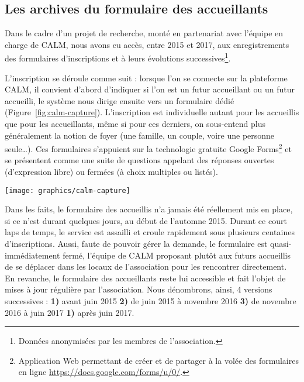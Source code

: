 \documentclass[symmetric,justified,marginals=raggedouter]{tufte-book}
\begin{document}
\subsection{Les archives du formulaire des accueillants}

\noindent Dans le cadre d'un projet de recherche, monté en partenariat avec l'équipe en charge de CALM, nous avons eu accès, entre 2015 et 2017, aux enregistrements des formulaires d'inscriptions et à leurs évolutions successives\footnote{\RaggedOuter Données anonymisées par les membres de l'association.}. 

L'inscription se déroule comme suit : lorsque l'on se connecte sur la plateforme CALM, il convient d'abord d'indiquer si l'on est un futur accueillant ou un futur accueilli, le système nous dirige ensuite vers un formulaire dédié (Figure~\ref{fig:calm-capture}). L'inscription est individuelle autant pour les accueillis que pour les accueillants, même si pour ces derniers, on sous-entend plus généralement la notion de foyer (une famille, un  couple, voire une personne seule\ldots{}). Ces formulaires s'appuient sur la technologie gratuite Google Forms\footnote{\RaggedOuter Application Web permettant de créer et de partager à la volée des formulaires en ligne \url{https://docs.google.com/forms/u/0/}.} et se présentent comme une suite de questions appelant des réponses ouvertes (d'expression libre) ou fermées (à choix multiples ou listés).

\begin{figure*}
  \texttt{[image: graphics/calm-capture]}
  \caption{Premières questions du formulaire accueillants}
  \label{fig:calm-capture}
\end{figure*}

\noindent Dans les faits, le formulaire des accueillis n'a jamais été réellement mis en place, si ce n'est durant quelques jours, au début de l'automne 2015. Durant ce court laps de temps, le service est assailli et croule rapidement sous plusieurs centaines d'inscriptions. Aussi, faute de pouvoir gérer la demande, le formulaire est quasi-immédiatement fermé, l'équipe de CALM proposant plutôt aux futurs accueillis de se déplacer dans les locaux de l'association pour les rencontrer directement. En revanche, le formulaire des accueillants reste lui accessible et fait l'objet de mises à jour régulière par l'association. Nous dénombrons, ainsi, 4 versions successives : \textbf{1)} avant juin 2015 \textbf{2)} de juin 2015 à novembre 2016 \textbf{3)} de novembre 2016 à juin 2017 \textbf{1)} après juin 2017. 
\end{document}
